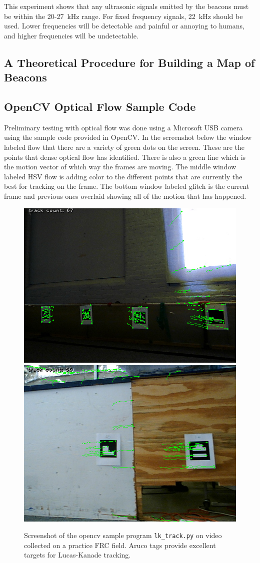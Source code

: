 \documentclass{article}
\begin{document}
    This experiment shows that any ultrasonic signals emitted by the beacons must be within the 20-27\SI{}{\kilo\hertz} range. For fixed frequency signals, \SI{22}{\kilo\hertz} should be used. Lower frequencies will be detectable and painful or annoying to humans, and higher frequencies will be undetectable.

  \subsection{A Theoretical Procedure for Building a Map of Beacons} \label{section:beacon_self_localization}


	\subsection{OpenCV Optical Flow Sample Code}

    Preliminary testing with optical flow was done using a Microsoft USB camera using the sample code provided in OpenCV. In the screenshot below the window labeled flow that there are a variety of green dots on the screen. These are the points that dense optical flow has identified. There is also a green line which is the motion vector of which way the frames are moving. The middle window labeled HSV flow is adding color to the different points that are currently the best for tracking on the frame. The bottom window labeled glitch is the current frame and previous ones overlaid showing all of the motion that has happened.

    \begin{figure}[H]
      \centering
      \includegraphics[width=0.49\linewidth]{./images/optflow.png}
      \includegraphics[width=0.49\linewidth]{./images/optflow_2.png}
      \caption{Screenshot of the opencv sample program \texttt{lk\_track.py} on video collected on a practice FRC field. Aruco tags provide excellent targets for Lucas-Kanade tracking.}
      \label{fig:opt_flow}
    \end{figure}
\end{document}

